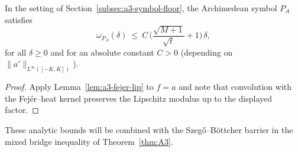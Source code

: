 \begin{corollary}\label{cor:a3-omega-fejer}
In the setting of Section~\ref{subsec:a3-symbol-floor}, the Archimedean symbol $P_A$ satisfies
\[
  \omega_{P_A}(\delta) \ \le\ C\,\Big(\frac{\sqrt{M+1}}{\sqrt{t}}+1\Big)\,\delta,
\]
for all $\delta\ge0$ and for an absolute constant $C>0$ (depending on $\|a'\|_{L^\infty([-K,K])}$).
\end{corollary}
\begin{proof}
Apply Lemma~\ref{lem:a3-fejer-lip} to $f=a$ and note that convolution with the Fej\'er--heat kernel preserves the Lipschitz modulus up to the displayed factor.
\end{proof}

These analytic bounds will be combined with the Szeg\H{o}--B\"ottcher barrier in the mixed bridge inequality of Theorem~\ref{thm:A3}.
